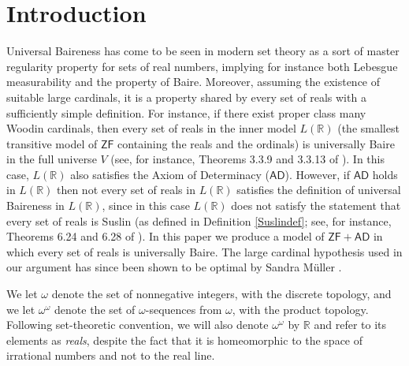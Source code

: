 \documentclass[fleqn, 11pt]{amsart}
\theoremstyle{plain}
\theoremstyle{definition}
\theoremstyle{remark}
\newcommand{\bbR}{\mathbb{R}}
\newcommand{\ZF}{\mathsf{ZF}}
\newcommand{\AD}{\mathsf{AD}}
\begin{document}
\maketitle












\section{Introduction}\label{sec-introduction}



Universal Baireness has come to be seen in modern set theory as a sort of master regularity property for sets of real numbers, implying for instance both Lebesgue measurability and the property of Baire. Moreover, assuming the existence of suitable large cardinals, it is a property shared by every set of reals with a sufficiently simple definition. For instance, if there exist proper class many Woodin cardinals, then every set of reals in the inner model $L(\mathbb{R})$ (the smallest transitive model of $\ZF$ containing the reals and the ordinals) is universally Baire in the full universe $V$ (see, for instance, Theorems 3.3.9 and 3.3.13 of \cite{LarStationaryTower}). In this case, $L(\bbR)$ also satisfies the Axiom of Determinacy ($\AD$). 
However, if $\AD$ holds in $L(\bbR)$ then not every set of reals in $L(\mathbb{R})$ satisfies the definition of universal Baireness in $L(\mathbb{R})$, since in this case $L(\mathbb{R})$ does not satisfy the statement that every set of reals is Suslin (as defined in Definition \ref{Suslindef}; see, for instance, Theorems 6.24 and 6.28 of \cite{Larson:Extensions}). In this paper we produce a model of $\ZF + \AD$ in which every set of reals is universally Baire. The large cardinal hypothesis used in our argument has since been shown to be optimal by Sandra M\"{u}ller \cite{Muller:consistency}.



We let $\omega$ denote the set of nonnegative integers, with the discrete topology, and we let $\omega^\omega$ denote the set of $\omega$-sequences from $\omega$, with the product topology. Following set-theoretic convention, we will also denote $\omega^\omega$ by $\mathbb{R}$ and refer to its elements as \emph{reals}, despite the fact that it is homeomorphic to the space of irrational numbers and not to the real line.
\end{document}
